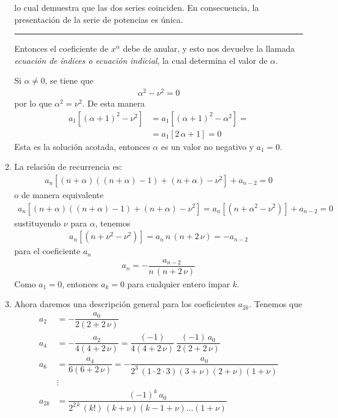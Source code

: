 \begin{enumerate}[label=\textbf{Paso \arabic*}.]
lo cual demuestra que las dos series coinciden. En consecuencia, la presentación de la serie de potencias es única.
\vspace{0.25em}
\hrule
\vspace{0.25em}
Entonces el coeficiente de $x^{\alpha}$ debe de anular, y esto nos devuelve la llamada \emph{ecuación de índices o ecuación indicial}, la cual determina el valor de $\alpha$.
\par
Si $\alpha \neq 0$, se tiene que
\begin{align*}
\alpha^{2} - \nu^{2} = 0
\end{align*}
por lo que $\alpha^{2} = \nu^{2}$. De esta manera
\begin{align*}
a_{1} \left[ (\alpha + 1)^{2} - \nu^{2} \right] &= a_{1} \left[ (\alpha + 1)^{2} - \alpha^{2} \right] =  \\
&= a_{1} \left[ 2 \, \alpha + 1 \right] = 0
\end{align*}
Esta es la solución acotada, entonces $\alpha$ es un valor no negativo y $a_{1} = 0$.
\item La relación de recurrencia es:
\begin{align*}
a_{n} \left[ (n + \alpha)((n + \alpha) - 1) + (n + \alpha) - \nu^{2} \right] +  a_{n-2} = 0
\end{align*}
o de manera equivalente
\begin{align*}
a_{n} \left[ (n + \alpha)((n + \alpha) - 1) + (n + \alpha) - \nu^{2} \right] = a_{n} \left[ (n + \alpha^{2} - \nu^{2}) \right] + a_{n-2} = 0
\end{align*}
sustituyendo $\nu$ para $\alpha$, tenemos
\begin{align*}
a_{n} \left[ (n + \nu^{2} - \nu^{2}) \right] = a_{n} \, n \, (n + 2 \, \nu) = - a_{n-2}
\end{align*}
para el coeficiente $a_{n}$
\begin{align*}
a_{n} = - \dfrac{a_{n-2}}{n \, (n + 2 \, \nu)}
\end{align*}
Como $a_{1} = 0$, entonces $a_{k} = 0$ para cualquier entero impar $k$.
\item Ahora daremos una descripción general para los coeficientes $a_{2k}$. Tenemos que
\begin{align*}
a_{2} &= - \dfrac{a_{0}}{2 (2 + 2 \, \nu)} \\
a_{4} &= - \dfrac{a_{2}}{4 (4 + 2 \, \nu)} = \dfrac{(-1)}{4 (4 + 2 \, \nu)} \, \dfrac{(-1) \, a_{0}}{2 (2 + 2 \, \nu)} \\
a_{6} &= \dfrac{a_{4}}{6 (6 + 2 \, \nu)} = - \dfrac{a_{0}}{2^{3} \, (1 \cdot 2 \cdot 3)(3 + \nu)(2 + \nu)(1 + \nu)} \\
&\vdots \\
a_{2k} &= \dfrac{(-1)^{k} \, a_{0}}{2^{2 \, k} \, (k!) \, (k + \nu)(k - 1 + \nu) \ldots (1 + \nu)}
\end{align*}
\end{enumerate}
